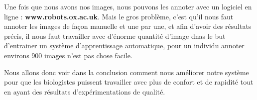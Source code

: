         Une fois que nous avons nos images, nous pouvons les annoter avec un logiciel en ligne : \textbf{www.robots.ox.ac.uk}.
        Mais le gros problème, c'est qu'il nous faut annoter les images de façon manuelle et une par une, et afin d'avoir des résultats précis, il nous faut travailler avec d'énorme quantité d'image dnas le but d'entrainer un système d'apprentissage automatique, pour un individu annoter environs 900 images n'est pas chose facile.

        \vspace{0.2cm}

        Nous allons donc voir dans la conclusion comment nous améliorer notre système pour que les biologistes puissent travailler avec plus de confort et de rapidité tout en ayant des résultats d'expérimentations de qualité.
